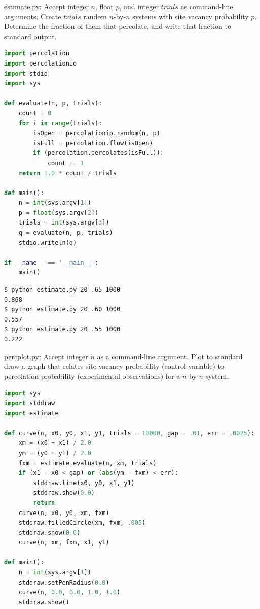 \documentclass[8pt,a4paper,compress]{beamer}
\begin{document}
\begin{frame}[fragile]
\pause

\begin{framed}
\tiny estimate.py: Accept integer $n$, float $p$, and integer $trials$ as command-line arguments. Create $trials$ random $n$-by-$n$ systems with site vacancy probability $p$. Determine the fraction of them that percolate, and
write that fraction to standard output.
\end{framed}

\begin{lstlisting}[language=Python]
import percolation
import percolationio
import stdio
import sys

def evaluate(n, p, trials):
    count = 0
    for i in range(trials):
        isOpen = percolationio.random(n, p)
        isFull = percolation.flow(isOpen)
        if (percolation.percolates(isFull)):
            count += 1
    return 1.0 * count / trials

def main():
    n = int(sys.argv[1])
    p = float(sys.argv[2])
    trials = int(sys.argv[3])
    q = evaluate(n, p, trials)
    stdio.writeln(q)

if __name__ == '__main__':
    main()
\end{lstlisting}

\pause

\begin{lstlisting}[language={}]
$ python estimate.py 20 .65 1000
0.868
$ python estimate.py 20 .60 1000
0.557
$ python estimate.py 20 .55 1000
0.222
\end{lstlisting}
\end{frame}

\begin{frame}[fragile]
\pause

\begin{framed}
\tiny percplot.py:  Accept integer $n$ as a command-line argument. Plot to standard draw a graph that relates site vacancy probability (control variable) to percolation probability (experimental observations) for a $n$-by-$n$ system.
\end{framed}

\begin{lstlisting}[language=Python]
import sys
import stddraw
import estimate

def curve(n, x0, y0, x1, y1, trials = 10000, gap = .01, err = .0025):
    xm = (x0 + x1) / 2.0
    ym = (y0 + y1) / 2.0
    fxm = estimate.evaluate(n, xm, trials)
    if (x1 - x0 < gap) or (abs(ym - fxm) < err):
        stddraw.line(x0, y0, x1, y1)
        stddraw.show(0.0)
        return
    curve(n, x0, y0, xm, fxm)
    stddraw.filledCircle(xm, fxm, .005)
    stddraw.show(0.0)
    curve(n, xm, fxm, x1, y1)
    
def main():
    n = int(sys.argv[1])
    stddraw.setPenRadius(0.0)
    curve(n, 0.0, 0.0, 1.0, 1.0)
    stddraw.show()
\end{lstlisting}
\end{frame}
\end{document}
